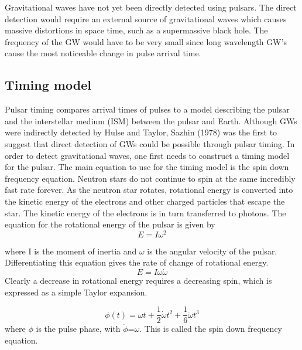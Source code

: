 \documentclass[12pt]{article}
\begin{document}
	\noindent Gravitational waves have not yet been directly detected using pulsars. The direct detection would require an external source of gravitational waves which causes massive distortions in space time, such as a supermassive black hole. The frequency of the GW would have to be very small since long wavelength GW's cause the most noticeable change in pulse arrival time. 
	
	\subsection{Timing model}
	
	Pulsar timing compares arrival times of pulses to a model describing the pulsar and the interstellar medium (ISM) between the pulsar and Earth. Although GWs were indirectly detected by Hulse and Taylor, Sazhin (1978) was the ﬁrst to suggest that direct detection of GWs could be possible through pulsar timing. In order to detect gravitational waves, one first needs to construct a timing model for the pulsar. The main equation to use for the timing model is the spin down frequency equation. Neutron stars do not continue to spin at the same incredibly fast rate forever. As the neutron star rotates, rotational energy is converted into the kinetic energy of the electrons and other charged particles that escape the star. The kinetic energy of the electrons is in turn transferred to photons. The equation for the rotational energy of the pulsar is given by
	\begin{equation}\label{rotational energy}
	E=I \omega^2
	\end{equation}
	
	where I is the moment of inertia and $\omega$ is the angular velocity of the pulsar. Differentiating this equation gives the rate of change of rotational energy.
	\begin{equation}\label{rotational energy derivative}
	E=I \omega \dot{\omega}
	\end{equation}
	Clearly a decrease in rotational energy requires a decreasing spin, which is expressed as a simple Taylor expansion.
	
	\begin{equation}\label{spin down frequency equation}
	\phi(t)=\omega t +\frac{1}{2}\dot{\omega} t^2+\frac{1}{6} \ddot{\omega} t^3
	\end{equation}
	where $\phi$ is the pulse phase, with $\dot{\phi}$=${\omega}$. This is called the spin down frequency equation. 
	
\end{document}

